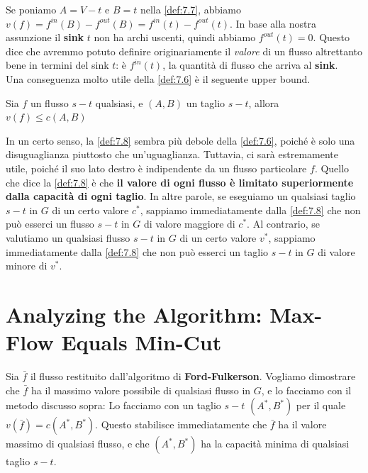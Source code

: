 Se poniamo $A = V - {t}$ e $B = {t}$ nella \ref{def:7.7}, abbiamo
$v(f) = f^{in}(B) - f^{out}(B) = f^{in}(t) - f^{out}(t)$. In base alla
nostra assunzione il \textbf{sink} $t$ non ha archi uscenti, quindi
abbiamo $f^{out}(t) = 0$. Questo dice che avremmo potuto definire
originariamente il \emph{valore} di un flusso altrettanto bene in
termini del sink $t$: è $f^{in}(t)$, la quantità di flusso che
arriva al \textbf{sink}.\\

Una conseguenza molto utile della \ref{def:7.6} è il seguente upper bound.

\begin{myblockquote}
	\begin{minipage}{\textwidth}
		\begin{definition}\label{def:7.8}
			Sia $f$ un flusso $s-t$ qualsiasi, e $(A, B)$ un taglio $s-t$, allora
			$
				v(f) \le c(A, B)
			$
		\end{definition}
	\end{minipage}
\end{myblockquote}

In un certo senso, la \ref{def:7.8} sembra più debole della \ref{def:7.6},
poiché è solo una disuguaglianza piuttosto che un'uguaglianza. Tuttavia, ci sarà
estremamente utile, poiché il suo lato destro è indipendente da un flusso
particolare $f$. Quello che dice la \ref{def:7.8} è che \textbf{il valore di
	ogni flusso è limitato superiormente dalla capacità di ogni taglio}. In altre
parole, se eseguiamo un qualsiasi taglio $s-t$ in $G$ di un certo valore
$c^{*}$, sappiamo immediatamente dalla \ref{def:7.8} che non può esserci un
flusso $s-t$ in $G$ di valore maggiore di $c^{*}$. Al contrario, se valutiamo un
qualsiasi flusso $s-t$ in $G$ di un certo valore $v^{*}$, sappiamo
immediatamente dalla \ref{def:7.8} che non può esserci un taglio $s-t$ in $G$ di valore
minore di $v^{*}$.

\section{Analyzing the Algorithm: Max-Flow Equals Min-Cut}

Sia $\bar{f}$ il flusso restituito dall'algoritmo di
\textbf{Ford-Fulkerson}. Vogliamo dimostrare che $\bar{f}$ ha il
massimo valore possibile di qualsiasi flusso in $G$, e lo facciamo con
il metodo discusso sopra: Lo facciamo con un taglio $s-t$
$(A^{*} , B^{*})$ per il quale $v(\bar{f}) = c(A^{*} , B^{*})$. Questo
stabilisce immediatamente che $\bar{f}$ ha il valore massimo di
qualsiasi flusso, e che $(A^{*} , B^{*})$ ha la capacità minima di
qualsiasi taglio $s-t$.\\

